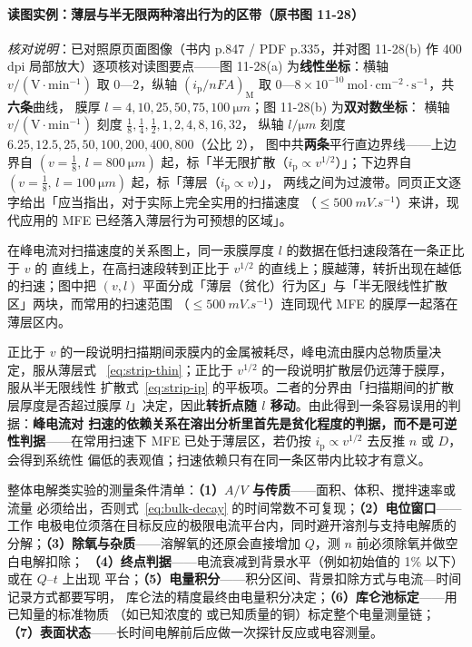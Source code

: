 \paragraph{读图实例：薄层与半无限两种溶出行为的区带（原书图 11-28）}
\emph{核对说明}：已对照原页面图像（书内 p.847 / PDF p.335，并对图 11-28(b) 作
400 dpi 局部放大）逐项核对读图要点——图 11-28(a) 为\textbf{线性坐标}：横轴
$v/(\mathrm{V{\cdot}min^{-1}})$ 取 $0$—$2$，纵轴 $(i_{\mathrm{p}}/nFA)_{\mathrm{M}}$
取 $0$—$8\times10^{-10}\ \mathrm{mol{\cdot}cm^{-2}{\cdot}s^{-1}}$，共\textbf{六条}曲线，
膜厚 $l=4,10,25,50,75,100\ \unit{\micro m}$；图 11-28(b) 为\textbf{双对数坐标}：
横轴 $v/(\mathrm{V{\cdot}min^{-1}})$ 刻度 $\tfrac{1}{8},\tfrac{1}{4},\tfrac{1}{2},1,2,4,8,16,32$，
纵轴 $l/\unit{\micro m}$ 刻度 $6.25,12.5,25,50,100,200,400,800$（公比 $2$），
图中共\textbf{两条}平行直边界线——上边界自 $(v=\tfrac{1}{8},\,l=\qty{800}{\micro m})$
起，标「半无限扩散（$i_{\mathrm{p}}\propto v^{1/2}$）」；下边界自
$(v=\tfrac{1}{8},\,l=\qty{100}{\micro m})$ 起，标「薄层（$i_{\mathrm{p}}\propto v$）」，
两线之间为过渡带。同页正文逐字给出「应当指出，对于实际上完全实用的扫描速度
（$\le \qty{500}{mV.s^{-1}}$）来讲，现代应用的 MFE 已经落入薄层行为可预想的区域」。

\begin{obs}
在峰电流对扫描速度的关系图上，同一汞膜厚度 $l$ 的数据在低扫速段落在一条正比于 $v$ 的
直线上，在高扫速段转到正比于 $v^{1/2}$ 的直线上；膜越薄，转折出现在越低的扫速；图中把
$(v,l)$ 平面分成「薄层（贫化）行为区」与「半无限线性扩散区」两块，而常用的扫速范围
（$\le \qty{500}{mV.s^{-1}}$）连同现代 MFE 的膜厚一起落在薄层区内。
\end{obs}

\begin{infer}
正比于 $v$ 的一段说明扫描期间汞膜内的金属被耗尽，峰电流由膜内总物质量决定，服从薄层式
~\eqref{eq:strip-thin}；正比于 $v^{1/2}$ 的一段说明扩散层仍远薄于膜厚，服从半无限线性
扩散式~\eqref{eq:strip-ip} 的平板项。二者的分界由「扫描期间的扩散层厚度是否超过膜厚
$l$」决定，因此\textbf{转折点随 $l$ 移动}。由此得到一条容易误用的判据：\textbf{峰电流对
扫速的依赖关系在溶出分析里首先是贫化程度的判据，而不是可逆性判据}——在常用扫速下 MFE
已处于薄层区，若仍按 $i_{\mathrm{p}}\propto v^{1/2}$ 去反推 $n$ 或 $D$，会得到系统性
偏低的表观值；扫速依赖只有在同一条区带内比较才有意义。
\end{infer}

\begin{measure}
整体电解类实验的测量条件清单：\textbf{（1）$A/V$ 与传质}——面积、体积、搅拌速率或流量
必须给出，否则式~\eqref{eq:bulk-decay} 的时间常数不可复现；\textbf{（2）电位窗口}——工作
电极电位须落在目标反应的极限电流平台内，同时避开溶剂与支持电解质的分解；\textbf{（3）除氧与杂质}——溶解氧的还原会直接增加 $Q$，测 $n$ 前必须除氧并做空白电解扣除；
\textbf{（4）终点判据}——电流衰减到背景水平（例如初始值的 1\% 以下）或在 $Q$–$t$ 上出现
平台；\textbf{（5）电量积分}——积分区间、背景扣除方式与电流—时间记录方式都要写明，
库仑法的精度最终由电量积分决定；\textbf{（6）库仑池标定}——用已知量的标准物质
（如已知浓度的  或已知质量的铜）标定整个电量测量链；
\textbf{（7）表面状态}——长时间电解前后应做一次探针反应或电容测量。
\end{measure}

